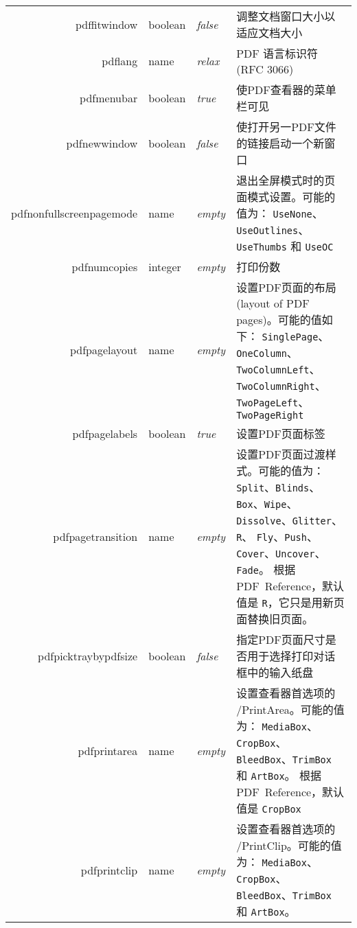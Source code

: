 \documentclass{article}
\begin{document}
\begin{longtable}{@{}>{\ttfamily}r>{\raggedright}p{}>{\itshape}lp{7cm}@{}}
pdffitwindow       & boolean & false & 调整文档窗口大小以适应文档大小 \\
pdflang            & name    & relax & PDF 语言标识符 (RFC 3066)\\
pdfmenubar         & boolean & true  & 使PDF查看器的菜单栏可见 \\
pdfnewwindow       & boolean & false & 使打开另一PDF文件的链接启动一个新窗口 \\
pdfnonfullscreenpagemode
                   & name    & empty & 退出全屏模式时的页面模式设置。可能的值为：
                                       \verb|UseNone|、\verb|UseOutlines|、\verb|UseThumbs| 和 \verb|UseOC|\\
pdfnumcopies       & integer & empty & 打印份数 \\
pdfpagelayout      & name    & empty & 设置PDF页面的布局(layout of PDF pages)。可能的值如下：
                                       \verb|SinglePage|、\verb|OneColumn|、
                                       \verb|TwoColumnLeft|、\verb|TwoColumnRight|、
                                       \verb|TwoPageLeft|、\verb|TwoPageRight| \\
pdfpagelabels      & boolean & true  & 设置PDF页面标签 \\
pdfpagetransition  & name    & empty & 设置PDF页面过渡样式。可能的值为：
                                       \verb|Split|、\verb|Blinds|、\verb|Box|、\verb|Wipe|、
                                       \verb|Dissolve|、\verb|Glitter|、\verb|R|、
                                       \verb|Fly|、\verb|Push|、
                                       \verb|Cover|、\verb|Uncover|、
                                       \verb|Fade|。
                                       根据PDF~Reference，默认值是 \verb|R|，它只是用新页面替换旧页面。\\
pdfpicktraybypdfsize
                   & boolean & false & 指定PDF页面尺寸是否用于选择打印对话框中的输入纸盘 \\
pdfprintarea       & name    & empty & 设置查看器首选项的 /PrintArea。可能的值为：
                                       \verb|MediaBox|、\verb|CropBox|、
                                       \verb|BleedBox|、\verb|TrimBox| 和 \verb|ArtBox|。
                                       根据PDF~Reference，默认值是 \verb|CropBox|\\
pdfprintclip       & name    & empty & 设置查看器首选项的 /PrintClip。可能的值为：
                                       \verb|MediaBox|、\verb|CropBox|、
                                       \verb|BleedBox|、\verb|TrimBox| 和 \verb|ArtBox|。

\end{longtable}
\end{document}

